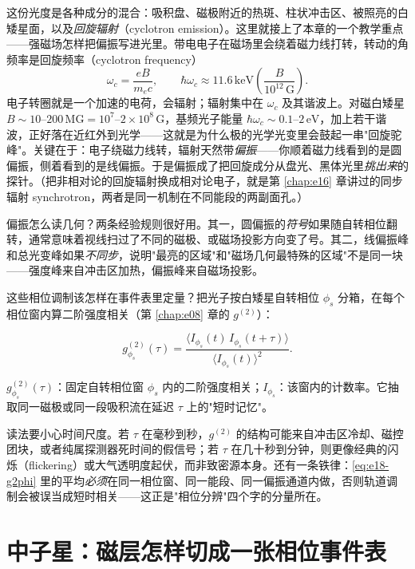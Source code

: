这份光度是各种成分的混合：吸积盘、磁极附近的热斑、柱状冲击区、被照亮的白矮星面，以及\emph{回旋辐射}（cyclotron emission）。这里就接上了本章的一个教学重点——强磁场怎样把偏振写进光里。带电电子在磁场里会绕着磁力线打转，转动的角频率是回旋频率（cyclotron frequency）
\[
  \omega_c=\frac{eB}{m_e c},
  \qquad
  \hbar\omega_c\approx 11.6\,\mathrm{keV}\left(\frac{B}{10^{12}\,\mathrm{G}}\right).
\]
电子转圈就是一个加速的电荷，会辐射；辐射集中在 \(\omega_c\) 及其谐波上。对磁白矮星 \(B\sim10\)–\(200\,\mathrm{MG}=10^7\)–\(2\times10^8\,\mathrm{G}\)，基频光子能量 \(\hbar\omega_c\sim0.1\)–\(2\,\mathrm{eV}\)，加上若干谐波，正好落在近红外到光学——这就是为什么极的光学光变里会鼓起一串"回旋驼峰"。关键在于：电子绕磁力线转，辐射天然带\emph{偏振}——你顺着磁力线看到的是圆偏振，侧着看到的是线偏振。于是偏振成了把回旋成分从盘光、黑体光里\emph{挑出来}的探针。（把非相对论的回旋辐射换成相对论电子，就是第 \ref{chap:e16} 章讲过的同步辐射 synchrotron，两者是同一机制在不同能段的两副面孔。）

偏振怎么读几何？两条经验规则很好用。其一，圆偏振的\emph{符号}如果随自转相位翻转，通常意味着视线扫过了不同的磁极、或磁场投影方向变了号。其二，线偏振峰和总光变峰如果\emph{不同步}，说明"最亮的区域"和"磁场几何最特殊的区域"不是同一块——强度峰来自冲击区加热，偏振峰来自磁场投影。

这些相位调制该怎样在事件表里定量？把光子按白矮星自转相位 \(\phi_s\) 分箱，在每个相位窗内算二阶强度相关（第 \ref{chap:e08} 章的 \(g^{(2)}\)）：

\begin{equation}
  g^{(2)}_{\phi_s}(\tau)=
  \frac{\langle I_{\phi_s}(t)\,I_{\phi_s}(t+\tau)\rangle}
       {\langle I_{\phi_s}(t)\rangle^2}.
  \label{eq:e18-g2phi}
\end{equation}
\begin{formulaexplain}
\(g^{(2)}_{\phi_s}(\tau)\)：固定自转相位窗 \(\phi_s\) 内的二阶强度相关；\(I_{\phi_s}\)：该窗内的计数率。它抽取同一磁极或同一段吸积流在延迟 \(\tau\) 上的"短时记忆"。
\end{formulaexplain}

读法要小心时间尺度。若 \(\tau\) 在毫秒到秒，\(g^{(2)}\) 的结构可能来自冲击区冷却、磁控团块，或者纯属探测器死时间的假信号；若 \(\tau\) 在几十秒到分钟，则更像经典的闪烁（flickering）或大气透明度起伏，而非致密源本身。还有一条铁律：\eqref{eq:e18-g2phi} 里的平均\emph{必须}在同一相位窗、同一能段、同一偏振通道内做，否则轨道调制会被误当成短时相关——这正是"相位分辨"四个字的分量所在。


\section{中子星：磁层怎样切成一张相位事件表}
\label{sec:e18-nsphase}

